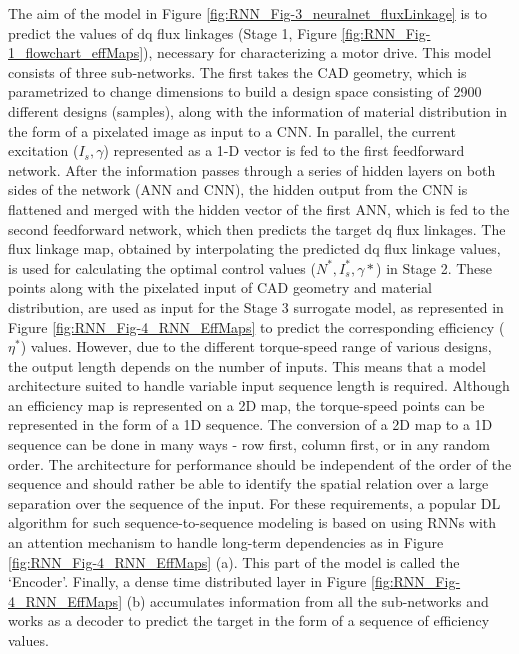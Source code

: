 The aim of the model in Figure \ref{fig:RNN_Fig-3_neuralnet_fluxLinkage} is to predict the values of dq flux linkages (Stage 1, Figure \ref{fig:RNN_Fig-1_flowchart_effMaps}), necessary for characterizing a motor drive. This model consists of three sub-networks. The first takes the CAD geometry, which is parametrized to change dimensions to build a design space consisting of 2900 different designs (samples), along with the information of material distribution in the form of a pixelated image as input to a CNN. In parallel, the current excitation ($I_s,\gamma$) represented as a 1-D vector is fed to the first feedforward network. After the information passes through a series of hidden layers on both sides of the network (ANN and CNN), the hidden output from the CNN is flattened and merged with the hidden vector of the first ANN, which is fed to the second feedforward network, which then predicts the target dq flux linkages. 
The flux linkage map, obtained by interpolating the predicted dq flux linkage values, is used for calculating the optimal control values ($N^*,I_s^*,\gamma*$) in Stage 2. These points along with the pixelated input of CAD geometry and material distribution, are used as input for the Stage 3 surrogate model, as represented in Figure \ref{fig:RNN_Fig-4_RNN_EffMaps} to predict the corresponding efficiency ($\eta^*$) values. However, due to the different torque-speed range of various designs, the output length depends on the number of inputs. This means that a model architecture suited to handle variable input sequence length is required. Although an efficiency map is represented on a 2D map, the torque-speed points can be represented in the form of a 1D sequence. The conversion of a 2D map to a 1D sequence can be done in many ways - row first, column first, or in any random order. The architecture for performance should be independent of the order of the sequence and should rather be able to identify the spatial relation over a large separation over the sequence of the input. For these requirements, a popular DL algorithm for such sequence-to-sequence modeling is based on using RNNs with an attention mechanism to handle long-term dependencies as in Figure \ref{fig:RNN_Fig-4_RNN_EffMaps} (a).  This part of the model is called the ‘Encoder’. Finally, a dense time distributed layer in Figure \ref{fig:RNN_Fig-4_RNN_EffMaps} (b) accumulates information from all the sub-networks and works as a decoder to predict the target in the form of a sequence of efficiency values.

